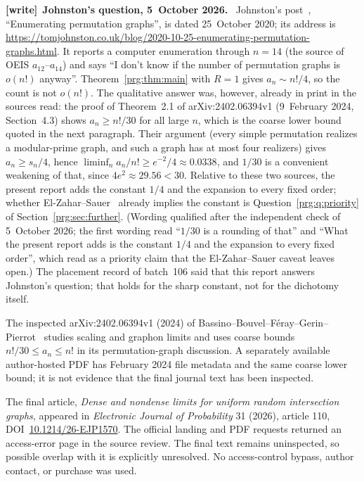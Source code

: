 \documentclass[11pt,letterpaper]{article}
\numberwithin{equation}{section}
\theoremstyle{definition}\newtheorem{definition}[theorem]{Definition}
\theoremstyle{remark}\newtheorem{remark}[theorem]{Remark}
\newenvironment{writenote}[1][]{\par\smallskip\begingroup\small
 \noindent\textbf{[write]}\if\relax\detokenize{#1}\relax\else~\textbf{#1.}\fi\ }%
 {\par\endgroup\smallskip}
\begin{document}
\begin{writenote}[Johnston's question, 5~October 2026]
Johnston's post~\cite{Johnston}, ``Enumerating permutation graphs'', is dated
25~October 2020; its address is\newline
\url{https://tomjohnston.co.uk/blog/2020-10-25-enumerating-permutation-graphs.html}.\newline
It reports a computer enumeration through $n=14$ (the source of OEIS
$a_{12}$--$a_{14}$) and says ``I don't know if the number of permutation
graphs is $o(n!)$ anyway''. Theorem~\ref{prg:thm:main} with $R=1$ gives
$a_n\sim n!/4$, so the count is not $o(n!)$. The qualitative answer was,
however, already in print in the sources read: the proof of Theorem~2.1 of
arXiv:2402.06394v1 (9~February 2024, Section~4.3) shows $a_n\ge n!/30$ for all
large $n$, which is the coarse lower bound quoted in the next paragraph. Their
argument (every simple permutation realizes a modular-prime graph, and such a
graph has at most four realizers) gives $a_n\ge s_n/4$, hence
$\liminf_{n}a_n/n!\ge e^{-2}/4\approx0.0338$, and $1/30$ is a convenient
weakening of that, since $4e^2\approx29.56<30$. Relative to these two sources,
the present report adds the constant $1/4$ and the expansion to every fixed
order; whether El-Zahar--Sauer~\cite{ES} already implies the constant is
Question~\ref{prg:q:priority} of Section~\ref{prg:sec:further}.
\textup{(Wording qualified after the independent check of 5~October 2026; the
first wording read ``$1/30$ is a rounding of that'' and ``What the present
report adds is the constant $1/4$ and the expansion to every fixed order'',
which read as a priority claim that the El-Zahar--Sauer caveat leaves open.)}
The placement record of batch~106 said
that this report answers Johnston's question; that holds for the sharp
constant, not for the dichotomy itself.
\end{writenote}

The inspected arXiv:2402.06394v1 (2024) of
Bassino--Bouvel--F\'eray--Gerin--Pierrot~\cite{BBFGP} studies
scaling and graphon limits and uses coarse bounds
$n!/30\leq a_n\leq n!$ in its permutation-graph discussion.
A separately available author-hosted PDF has February 2024 file
metadata and the same coarse lower bound; it is not evidence that
the final journal text has been inspected.

The final article, \emph{Dense and nondense limits for uniform
random intersection graphs}, appeared in \emph{Electronic Journal
of Probability} 31 (2026), article 110,
DOI~\href{https://doi.org/10.1214/26-EJP1570}{10.1214/26-EJP1570}.
The official landing and PDF requests returned an access-error
page in the source review. The final text remains uninspected, so
possible overlap with it is explicitly unresolved. No access-control
bypass, author contact, or purchase was used.
\end{document}
